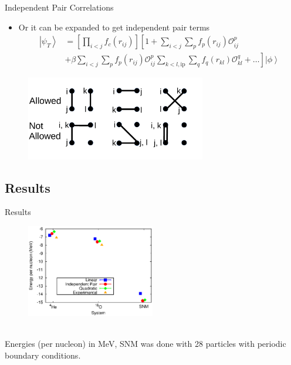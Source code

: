 \documentclass{beamer}
\newcommand{\ket}[1]{\left| #1 \right>}
\newcommand{\fpij}{f_p(r_{ij})}
\newcommand{\Opij}{\mathcal{O}_{ij}^p}
\newcommand{\fOpij}{\sum\limits_{i<j}\sum\limits_p \fpij\Opij}
\newcommand{\fqkl}{f_q(r_{kl})}
\newcommand{\Oqkl}{\mathcal{O}_{kl}^q}
\newcommand{\fOqklip}{\sum\limits_{k<l,\mathrm{ip}}\sum\limits_q \fqkl\Oqkl}
\begin{document}
\begin{frame}{Independent Pair Correlations}
\begin{itemize}
   \item Or it can be expanded to get independent pair terms
   \begin{equation*}
   \begin{split}
      \ket{\psi_T} &= \left[\prod\limits_{i<j}f_c(r_{ij})\right] \left[1+\fOpij\right. \\
      & + \left.\beta\fOpij\fOqklip + \ldots \right] \ket{\phi}
   \end{split}
   \end{equation*}
\end{itemize}
\begin{figure}[h]
   \centering
   \includegraphics[width=0.7\textwidth]{figures/pairing.pdf}
\end{figure}

\end{frame}

\subsection{Results}
\begin{frame}{Results}
\begin{figure}[h]
   \centering
   \includegraphics[width=0.5\textwidth]{figures/energy.eps}
\end{figure}
\begin{table}[h!]
   \centering
   \\ Energies (per nucleon) in MeV, SNM was done with 28 particles with periodic boundary conditions.
\end{table}
\end{frame}
\end{document}
